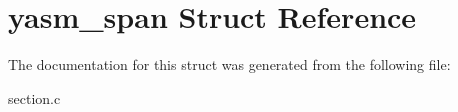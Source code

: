 \hypertarget{structyasm__span}{\section{yasm\-\_\-span Struct Reference}
\label{structyasm__span}
}


The documentation for this struct was generated from the following file\-:\begin{DoxyCompactItemize}
\item 
section.\-c\end{DoxyCompactItemize}
